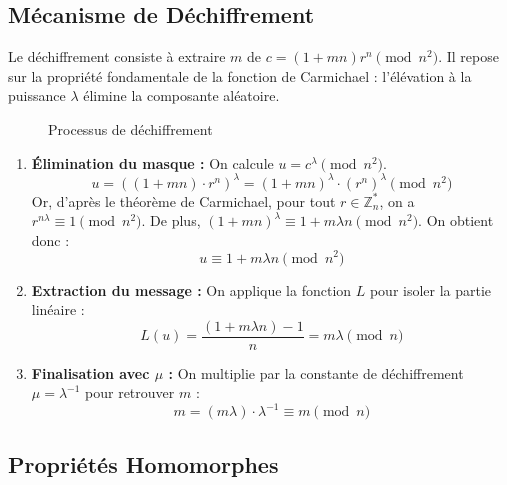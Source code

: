 \documentclass[12pt,a4paper]{report}
\begin{document}
\subsection{Mécanisme de Déchiffrement}

Le déchiffrement consiste à extraire $m$ de $c = (1+mn)r^n \pmod{n^2}$. Il repose sur la propriété fondamentale de la fonction de Carmichael : l'élévation à la puissance $\lambda$ élimine la composante aléatoire.


\begin{figure}[h]
\centering
{}

\caption{Processus de déchiffrement}
\end{figure}

\begin{enumerate}
    \item \textbf{Élimination du masque :} On calcule $u = c^\lambda \pmod{n^2}$.
    \[ u = ((1+mn) \cdot r^n)^\lambda = (1+mn)^\lambda \cdot (r^n)^\lambda \pmod{n^2} \]
    Or, d'après le théorème de Carmichael, pour tout $r \in \mathbb{Z}_n^*$, on a $r^{n\lambda} \equiv 1 \pmod{n^2}$. De plus, $(1+mn)^\lambda \equiv 1 + m\lambda n \pmod{n^2}$. On obtient donc :
    \[ u \equiv 1 + m\lambda n \pmod{n^2} \]
    \item \textbf{Extraction du message :} On applique la fonction $L$ pour isoler la partie linéaire :
    \[ L(u) = \frac{(1 + m\lambda n) - 1}{n} = m\lambda \pmod n \]
    \item \textbf{Finalisation avec $\mu$ :} On multiplie par la constante de déchiffrement $\mu = \lambda^{-1}$ pour retrouver $m$ :
    \[ m = (m\lambda) \cdot \lambda^{-1} \equiv m \pmod n \]
\end{enumerate}



\subsection{Propriétés Homomorphes}
\end{document}
